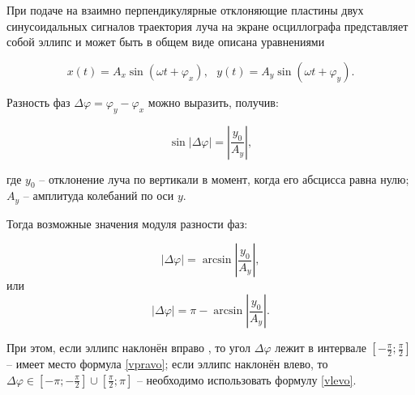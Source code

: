 \documentclass[a4paper,12pt]{article} %
\begin{document}
	При подаче на взаимно перпендикулярные отклоняющие пластины двух
	синусоидальных сигналов траектория луча на экране осциллографа
	представляет собой эллипс и может быть в общем виде описана
	уравнениями
	
	\begin{equation}
		x\left(t\right) = A_x \sin\left(\omega t + \varphi_x\right),\text{ }y\left(t\right) = A_y \sin\left(\omega t + \varphi_y\right).
	\end{equation}
	
	Разность фаз $ \Delta \varphi = \varphi_y - \varphi_x $ можно выразить, получив:
	
	\begin{equation}
		\sin \left|\Delta \varphi\right| = \left|\frac{y_0}{A_y}\right|,
	\end{equation}
	
	где $ y_0 $ -- отклонение луча по вертикали в момент, когда его абсцисса
	равна нулю; $ A_y $ -- амплитуда колебаний по оси $ y $.
	
	Тогда
	возможные значения модуля разности фаз:
	
	\begin{equation}
		\left|\Delta \varphi\right|=\arcsin\left|\frac{y_0}{A_y}\right|, \label{vpravo}
	\end{equation}
	или
	\begin{equation}
		\left|\Delta \varphi\right|=\pi - \arcsin\left|\frac{y_0}{A_y}\right|. \label{vlevo}
	\end{equation}
	
	При этом, если эллипс наклонён вправо , то угол $ \Delta \varphi $ лежит в
	интервале $ \left[-\frac{\pi}{2};\frac{\pi}{2}\right] $ -- имеет место формула \eqref{vpravo}; если эллипс наклонён влево, то $ \Delta \varphi \in \left[-\pi;-\frac{\pi}{2}\right]\cup\left[\frac{\pi}{2};\pi \right] $ -- необходимо использовать формулу \eqref{vlevo}.
	
	\newpage
	

	
	
	
	
	
\end{document}
